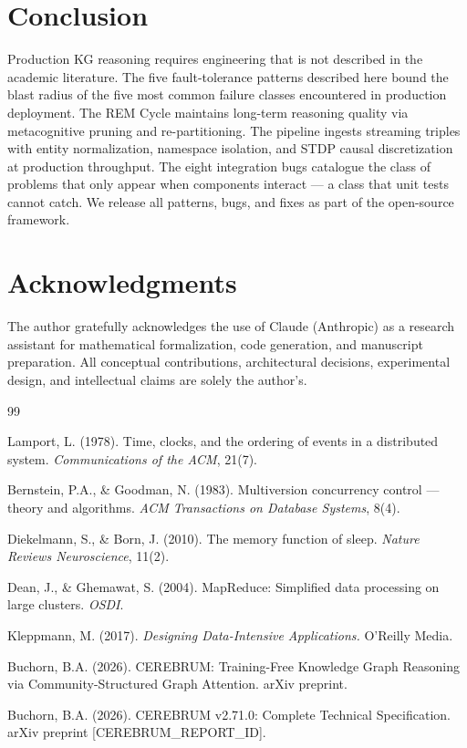 \documentclass[10pt,twocolumn]{article}
\begin{document}
\section{Conclusion}
\label{sec:conclusion}

Production KG reasoning requires engineering that is not described in the academic
literature. The five fault-tolerance patterns described here bound the blast radius of
the five most common failure classes encountered in production deployment. The REM Cycle
maintains long-term reasoning quality via metacognitive pruning and re-partitioning.
The \THALAMUS{} pipeline ingests streaming triples with entity normalization, namespace
isolation, and STDP causal discretization at production throughput. The eight
integration bugs catalogue the class of problems that only appear when components
interact — a class that unit tests cannot catch. We release all patterns, bugs, and
fixes as part of the open-source \CEREBRUM{} framework.

\section*{Acknowledgments}
The author gratefully acknowledges the use of Claude (Anthropic) as a research assistant
for mathematical formalization, code generation, and manuscript preparation. All
conceptual contributions, architectural decisions, experimental design, and intellectual
claims are solely the author's.


\begin{thebibliography}{99}

Lamport, L. (1978).
Time, clocks, and the ordering of events in a distributed system.
\emph{Communications of the ACM}, 21(7).

Bernstein, P.A., \& Goodman, N. (1983).
Multiversion concurrency control — theory and algorithms.
\emph{ACM Transactions on Database Systems}, 8(4).

Diekelmann, S., \& Born, J. (2010).
The memory function of sleep.
\emph{Nature Reviews Neuroscience}, 11(2).

Dean, J., \& Ghemawat, S. (2004).
MapReduce: Simplified data processing on large clusters.
\emph{OSDI}.

Kleppmann, M. (2017).
\emph{Designing Data-Intensive Applications.}
O'Reilly Media.

Buchorn, B.A. (2026).
CEREBRUM: Training-Free Knowledge Graph Reasoning via Community-Structured Graph Attention.
arXiv preprint.

Buchorn, B.A. (2026).
CEREBRUM v2.71.0: Complete Technical Specification.
arXiv preprint [CEREBRUM\_REPORT\_ID].

\end{thebibliography}
\end{document}
